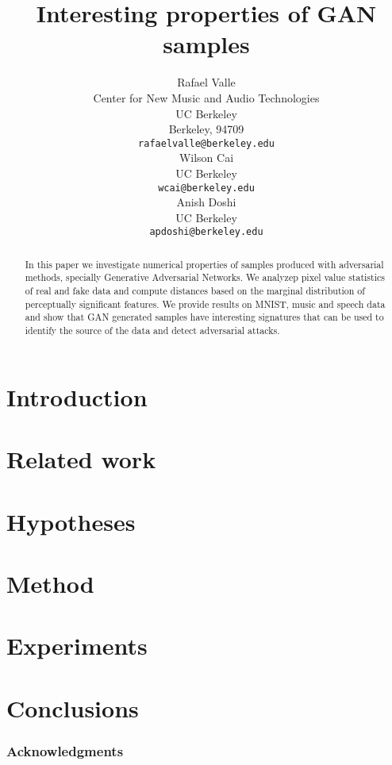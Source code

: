 \documentclass{article}
\title{Interesting properties of GAN samples}
\author{
  Rafael Valle \\
  Center for New Music and Audio Technologies \\
  UC Berkeley \\
  Berkeley, 94709 \\
  \texttt{rafaelvalle@berkeley.edu} \\
  \And
  Wilson Cai\\
  UC Berkeley\\
  \texttt{wcai@berkeley.edu} \\
  \And
  Anish Doshi\\
  UC Berkeley\\
  \texttt{apdoshi@berkeley.edu} \\
}
\begin{document}

\maketitle

\begin{abstract}
    In this paper we investigate numerical properties of samples produced 
    with adversarial methods, specially Generative Adversarial Networks. We
    analyzep pixel value statistics of real and fake data and compute distances based on the 
    marginal distribution of perceptually significant features. We provide results 
    on MNIST, music and speech data and show that GAN generated samples have 
    interesting signatures that can be used to identify the source of the data
    and detect adversarial attacks.
\end{abstract}

\theoremseparator{:}
\newtheorem{hyp}{Hypothesis}

\section{Introduction} \label{sec:introduction}

%
\section{Related work}\label{sec:related_work}

%
\section{Hypotheses}\label{sec:hypotheses}


\section{Method}\label{sec:method}

%
\section{Experiments}\label{sec:experiments}

%
\section{Conclusions}\label{sec:conclusions}

%

\subsubsection*{Acknowledgments}




\end{document}
